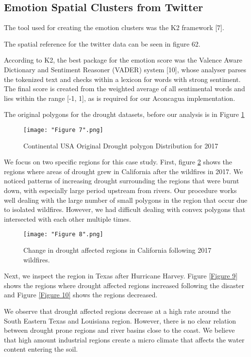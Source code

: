 \documentclass[conference]{IEEEtran}
\begin{document}
\subsection{Emotion Spatial Clusters from Twitter }

The tool used for creating the emotion clusters was the K2 framework [7].

The spatial reference for the twitter data can be seen in figure 62.


According to K2, the best package for the emotion score was the Valence Aware Dictionary and Sentiment Reasoner (VADER) system [10], whose analyser parses the tokenized text and checks within a lexicon for words with strong sentiment. The final score is created from the weighted average of all sentimental words and lies within the range [-1, 1], as is required for our Aconcagua implementation.



The original polygons for the drought datasets, before our analysis is in Figure \ref{Figure 7}

\begin{figure}[ht]
\centerline{\texttt{[image: "Figure 7".png]}}
\caption{Continental USA  Original Drought polygon Distribution for 2017}
\label{Figure 7}
\end{figure}

We focus on two specific regions for this case study. First, figure \ref{Figure 8} shows the regions where areas of drought grew in California after the wildfires in 2017. We noticed patterns of increasing drought surrounding the regions that were burnt down, with especially large period upstream from rivers. Our procedure works well dealing with the large number of small polygons in the region that occur due to isolated wildfires. However, we had difficult dealing with convex polygons that intersected with each other multiple times.

\begin{figure}[ht]
\centerline{\texttt{[image: "Figure 8".png]}}
\caption{Change in drought affected regions in California following 2017 wildfires.}
\label{Figure 8}
\end{figure}

Next, we inspect the region in Texas after Hurricane Harvey. Figure \ref{Figure 9} shows the regions where drought affected regions increased following the disaster and Figure \ref{Figure 10} shows the regions decreased.

We observe that drought affected regions decrease at a high rate around the South Eastern Texas and Louisiana region. However, there is no clear relation between drought prone regions and river basins close to the coast. We believe that high amount industrial regions create a micro climate that affects the water content entering the soil.
\end{document}
